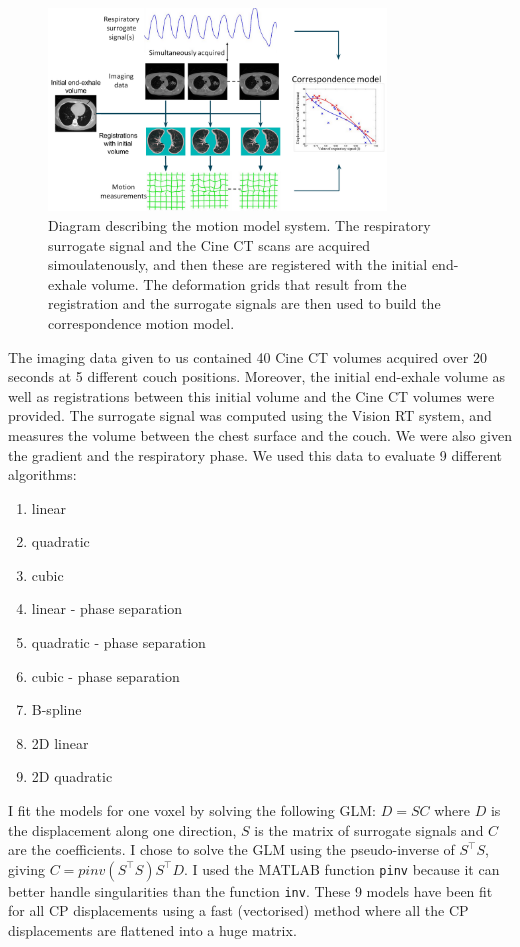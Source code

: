 \documentclass[11pt,a4paper,oneside]{report}
\begin{document}
\begin{figure}[H]
  \centering
 \includegraphics[width=0.8\textwidth]{figures/system_diagram.png}
 \caption{Diagram describing the motion model system. The respiratory surrogate signal and the Cine CT scans are acquired simoulatenously, and then these are registered with the initial end-exhale volume. The deformation grids that result from the registration and the surrogate signals are then used to build the correspondence motion model.}
\end{figure}

The imaging data given to us contained 40 Cine CT volumes acquired over 20 seconds at 5 different couch positions. Moreover, the initial end-exhale volume as well as registrations between this initial volume and the Cine CT volumes were provided. The surrogate signal was computed using the Vision RT system, and measures the volume between the chest surface and the couch. We were also given the gradient and the respiratory phase. We used this data to evaluate 9 different algorithms:
\begin{multicols}{3}
\begin{enumerate}
 \item linear
 \item quadratic
 \item cubic
 \item linear - phase separation
 \item quadratic - phase separation
 \item cubic - phase separation
 \item B-spline
 \item 2D linear
 \item 2D quadratic
\end{enumerate}
\end{multicols}

I fit the models for one voxel by solving the following GLM: $D = SC$ where $D$ is the displacement along one direction, $S$ is the matrix of surrogate signals and $C$ are the coefficients. I chose to solve the GLM using the pseudo-inverse of $S^\top S$, giving $C = pinv(S^\top S)S^\top D$. I used the MATLAB function \texttt{pinv} because it can better handle singularities than the function \texttt{inv}. These 9 models have been fit for all CP displacements using a fast (vectorised) method where all the CP displacements are flattened into a huge matrix. 
\end{document}
